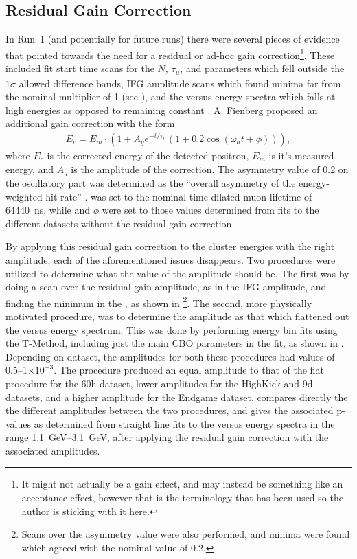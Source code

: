 \subsection{Residual Gain Correction}
\label{sub:residual_gain_correction}


In Run~1 (and potentially for future runs) there were several pieces of evidence that pointed towards the need for a residual or ad-hoc gain correction\footnote{It might not actually be a gain effect, and may instead be something like an acceptance effect, however that is the terminology that has been used so the author is sticking with it here.}. These included fit start time scans for the $N$, $\tau_{\mu}$, and \K parameters which fell outside the $1\sigma$ allowed difference bands, IFG amplitude scans which found minima far from the nominal multiplier of 1 (see ), and the \K versus energy spectra which falls at high energies as opposed to remaining constant \cite{phdthesis:2020Sweigart,phdthesis:2019Fienberg,AdHoc1,AdHoc2}. A. Fienberg proposed an additional gain correction with the form
\begin{align}
  E_{c} = E_{m} \cdot (1 + A_{g} e^{-t/\tau_{\mu}} (1 + 0.2 \cos(\omega_{a}t + \phi))),
\end{align}
where $E_{c}$ is the corrected energy of the detected positron, $E_{m}$ is it's measured energy, and $A_{g}$ is the amplitude of the correction. The asymmetry value of 0.2 on the oscillatory part was determined as the ``overall asymmetry of the energy-weighted hit rate'' \cite{phdthesis:2019Fienberg}. \taumu was set to the nominal time-dilated muon lifetime of \SI{64440}{}~ns, while \wa and $\phi$ were set to those values determined from fits to the different datasets without the residual gain correction.


By applying this residual gain correction to the cluster energies with the right amplitude, each of the aforementioned issues disappears. Two procedures were utilized to determine what the value of the amplitude should be. The first was by doing a scan over the residual gain amplitude, as in the IFG amplitude, and finding the minimum in the \chisq, as shown in \footnote{Scans over the asymmetry value were also performed, and minima were found which agreed with the nominal value of 0.2.}. The second, more physically motivated procedure, was to determine the amplitude as that which flattened out the \K versus energy spectrum. This was done by performing energy bin fits using the T-Method, including just the main CBO parameters in the fit, as shown in . Depending on dataset, the amplitudes for both these procedures had values of 0.5--1$\times 10^{-3}$. The \chisq procedure produced an equal amplitude to that of the flat \K procedure for the 60h dataset, lower amplitudes for the HighKick and 9d datasets, and a higher amplitude for the Endgame dataset.  compares directly the the different amplitudes between the two procedures, and gives the associated p-values as determined from straight line fits to the \K versus energy spectra in the range \SIrange{1.1}{3.1}{\GeV}, after applying the residual gain correction with the associated amplitudes. 


